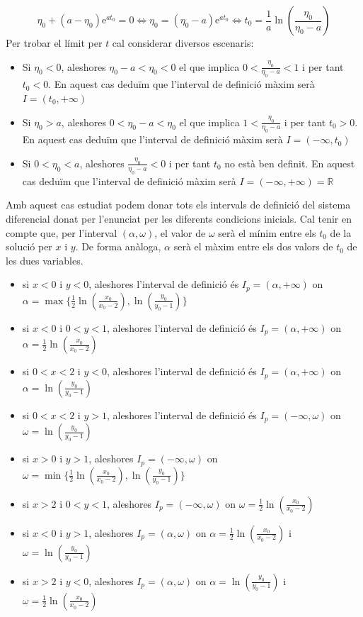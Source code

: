 \documentclass[10pt,a4paper]{article}
\renewcommand{\exp}[1]{\mathrm{e}^{#1}} %
\newcommand{\R}{\mathbb R}
\begin{document}
$$\eta_0+(a-\eta_0)\exp{at_0}=0 \iff \eta_0=(\eta_0-a)\exp{at_0} \iff t_0=\frac{1}{a}\ln\left(\frac{\eta_0}{\eta_0-a}\right)$$
Per trobar el límit per $t$ cal considerar diversos escenaris:
\begin{itemize}
  \item Si $\eta_0<0$, aleshores $\eta_0-a<\eta_0<0$ el que implica $0<\frac{\eta_0}{\eta_0-a}<1$ i per tant $t_0<0$. En aquest cas deduïm que l'interval de definició màxim serà $I=(t_0, +\infty)$
  \item Si $\eta_0>a$, aleshores $0<\eta_0-a<\eta_0$ el que implica $1<\frac{\eta_0}{\eta_0-a}$ i per tant $t_0>0$.
        En aquest cas deduïm que l'interval de definició màxim serà $I=(-\infty, t_0)$
  \item Si $0<\eta_0<a$, aleshores $\frac{\eta_0}{\eta_0-a}<0$ i per tant $t_0$ no està ben definit.
        En aquest cas deduïm que l'interval de definició màxim serà $I=(-\infty, +\infty)=\R$
\end{itemize}

Amb aquest cas estudiat podem donar tots els intervals de definició del sistema diferencial donat per l'enunciat per les diferents condicions inicials. Cal tenir en compte que, per l'interval $(\alpha, \omega)$, el valor de $\omega$ serà el mínim entre els $t_0$ de la solució per $x$ i $y$. De forma anàloga, $\alpha$ serà el màxim entre els dos valors de $t_0$ de les dues variables.
\begin{itemize}
  \item si $x<0$ i $y<0$, aleshores l'interval de definició és $I_p=(\alpha, +\infty)$ on $\alpha=\max\{\frac{1}{2}\ln\left(\frac{x_0}{x_0-2}\right), \ln\left(\frac{y_0}{y_0-1}\right)\}$
  \item si $x<0$ i $0<y<1$, aleshores l'interval de definició és $I_p=(\alpha, +\infty)$ on $\alpha=\frac{1}{2}\ln\left(\frac{x_0}{x_0-2}\right)$
  \item si $0<x<2$ i $y<0$, aleshores l'interval de definició és $I_p=(\alpha, +\infty)$ on $\alpha=\ln\left(\frac{y_0}{y_0-1}\right)$
  \item si $0<x<2$ i $y>1$, aleshores l'interval de definició és $I_p=(-\infty, \omega)$ on
        $\omega=\ln\left(\frac{y_0}{y_0-1}\right)$
  \item si $x>0$ i $y>1$, aleshores $I_p=(-\infty, \omega)$ on $\omega=\min\{\frac{1}{2}\ln\left(\frac{x_0}{x_0-2}\right), \ln\left(\frac{y_0}{y_0-1}\right)\}$
  \item si $x>2$ i $0<y<1$, aleshores $I_p=(-\infty, \omega)$ on
        $\omega=\frac{1}{2}\ln\left(\frac{x_0}{x_0-2}\right)$
  \item si $x<0$ i $y>1$, aleshores $I_p=(\alpha, \omega)$ on $\alpha=\frac{1}{2}\ln\left(\frac{x_0}{x_0-2}\right)$ i $\omega=\ln\left(\frac{y_0}{y_0-1}\right)$
  \item si $x>2$ i $y<0$, aleshores $I_p=(\alpha, \omega)$ on $\alpha=\ln\left(\frac{y_0}{y_0-1}\right)$ i $\omega=\frac{1}{2}\ln\left(\frac{x_0}{x_0-2}\right)$
\end{itemize}
\end{document}

